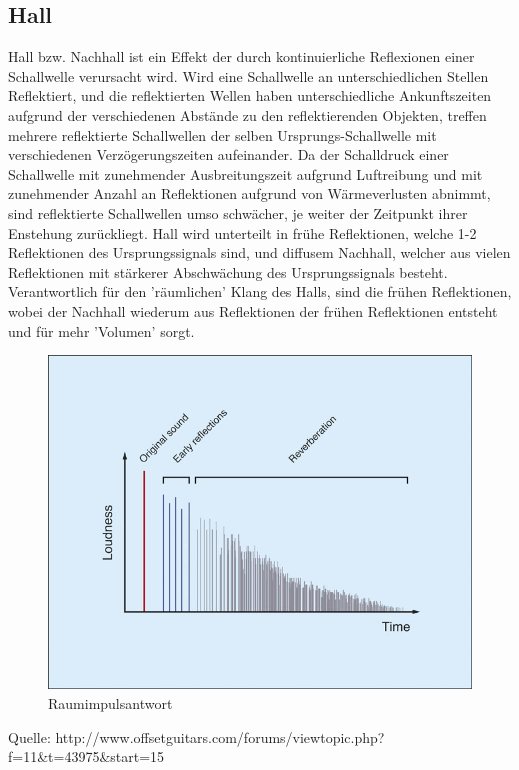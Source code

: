\documentclass[a4paper,12pt,fontsize=12,DIV=12]{scrartcl}
\begin{document}
\subsection{Hall}
Hall bzw. Nachhall ist ein Effekt der durch kontinuierliche Reflexionen einer Schallwelle verursacht wird.
Wird eine Schallwelle an unterschiedlichen Stellen Reflektiert, und die reflektierten Wellen haben unterschiedliche Ankunftszeiten aufgrund der verschiedenen Abstände zu den reflektierenden Objekten, treffen mehrere reflektierte Schallwellen der selben Ursprungs-Schallwelle mit verschiedenen Verzögerungszeiten aufeinander. Da der Schalldruck einer Schallwelle mit zunehmender Ausbreitungszeit aufgrund Luftreibung und mit zunehmender Anzahl an Reflektionen aufgrund von Wärmeverlusten abnimmt, sind reflektierte Schallwellen umso schwächer, je weiter der Zeitpunkt ihrer Enstehung zurückliegt.
Hall wird unterteilt in frühe Reflektionen, welche 1-2 Reflektionen des Ursprungssignals sind, und diffusem Nachhall, welcher aus vielen Reflektionen mit stärkerer Abschwächung des Ursprungssignals besteht. Verantwortlich für den 'räumlichen' Klang des Halls, sind die frühen Reflektionen, wobei der Nachhall wiederum aus Reflektionen der frühen Reflektionen entsteht und für mehr 'Volumen' sorgt.


\begin{figure}[h]
	\includegraphics[scale=0.5]{Bilder/raumimpulsantwort.jpg}
	\caption{Raumimpulsantwort}
	\label{labelname}
\end{figure}
Quelle: http://www.offsetguitars.com/forums/viewtopic.php?f=11\&t=43975\&start=15
\end{document}
